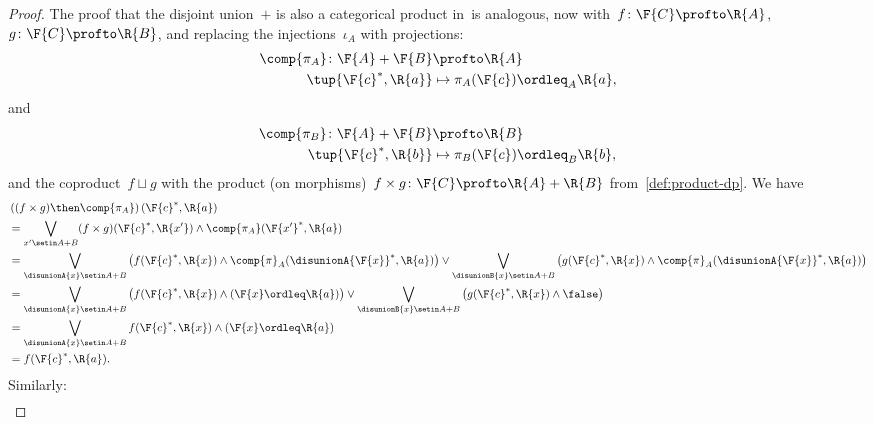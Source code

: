 \begin{proof}
    The proof that the disjoint union~$+$ is also a categorical product in~\DP is analogous, now with~$f \colon \F{C} \profto \R{A}$,~$g \colon \F{C} \profto \R{B}$, and replacing the injections~$\iota_A$ with projections:
    \begin{equation}
        \begin{aligned}
            \comp{\pi_A} \colon \F{A}+\F{B} & \profto \R{A} \\
            \tup{\F{c}^*,\R{a}}             & \mapsto \pi_A(\F{c})\ordleq_A \R{a},
        \end{aligned}
    \end{equation}
    and
    \begin{equation}
        \begin{aligned}
            \comp{\pi_B} \colon \F{A}+\F{B} & \profto \R{B} \\
            \tup{\F{c}^*,\R{b}}             & \mapsto \pi_B(\F{c})\ordleq_B \R{b},
        \end{aligned}
    \end{equation}
    and the coproduct~$f \sqcup g$ with the product (on morphisms)~$f \times g \colon \F{C} \profto \R{A} + \R{B}$ from~\cref{def:product-dp}.
    We have
    \begin{equation}
        \begin{aligned}
             & \left((f\times g)\then \comp{\pi_A}\right)(\F{c}^*,\R{a}) \\
             & =\bigvee_{x'\setin A+B} (f\times g)(\F{c}^*,\R{x'}) \wedge \comp{\pi_A}(\F{x'}^*,\R{a}) \\
             & =\bigvee_{\disunionA{x}\setin A+B}\left( f(\F{c}^*,\R{x}) \wedge \comp{\pi}_A(\disunionA{\F{x}}^*,\R{a})\right) \vee
            \bigvee_{\disunionB{x}\setin A+B}\left( g(\F{c}^*,\R{x}) \wedge \comp{\pi}_A(\disunionA{\F{x}}^*,\R{a})\right) \\
             & =\bigvee_{\disunionA{x}\setin A+B}\left( f(\F{c}^*,\R{x}) \wedge (\F{x}\ordleq \R{a})\right) \vee
            \bigvee_{\disunionB{x}\setin A+B}\left( g(\F{c}^*,\R{x}) \wedge \false \right) \\
             & =\bigvee_{\disunionA{x}\setin A+B} f(\F{c}^*,\R{x}) \wedge (\F{x}\ordleq \R{a}) \\
             & =f(\F{c}^*,\R{a}).
        \end{aligned}
    \end{equation}
    Similarly:
    \begin{equation}
        \begin{aligned}

\end{aligned}
\end{equation}
\end{proof}

